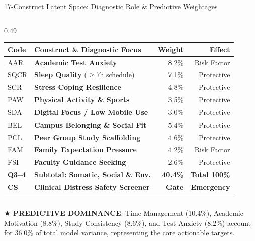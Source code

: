 \documentclass{beamer}
\begin{document}
\begin{frame}[t]{17-Construct Latent Space: Diagnostic Role \& Predictive Weightages}
\begin{columns}[T]
\begin{column}{0.49\textwidth}
\begin{tcolorbox}
        \renewcommand{\arraystretch}{0.65}
        \begin{tabularx}{\linewidth}{@{}l X r r@{}}
          \toprule
          \textbf{Code} & \textbf{Construct \& Diagnostic Focus} & \textbf{Weight} & \textbf{Effect} \\
          \midrule
          \rowcolor{BlueLight} AAR & \textbf{Academic Test Anxiety} & 8.2\% & Risk Factor \\
          \rowcolor{BlueLight} SQCR & \textbf{Sleep Quality} ($\ge 7$h schedule) & 7.1\% & Protective \\
          \rowcolor{BlueLight} SCR & \textbf{Stress Coping Resilience} & 4.8\% & Protective \\
          \rowcolor{BlueLight} PAW & \textbf{Physical Activity \& Sports} & 3.5\% & Protective \\
          \rowcolor{BlueLight} SDA & \textbf{Digital Focus / Low Mobile Use} & 3.0\% & Protective \\
          \midrule
          \rowcolor{CanvasBG} BEL & \textbf{Campus Belonging \& Social Fit} & 5.4\% & Protective \\
          \rowcolor{CanvasBG} PCL & \textbf{Peer Group Study Scaffolding} & 4.6\% & Protective \\
          \rowcolor{CanvasBG} FAM & \textbf{Family Expectation Pressure} & 4.2\% & Risk Factor \\
          \rowcolor{CanvasBG} FSI & \textbf{Faculty Guidance Seeking} & 2.6\% & Protective \\
          \midrule
          \textbf{Q3--4} & \textbf{Subtotal: Somatic, Social \& Env.} & \textbf{40.4\%} & \textbf{Total 100\%} \\
          \rowcolor{GoldBG} \textbf{CS} & \textbf{Clinical Distress Safety Screener} & \textbf{Gate} & \textbf{Emergency} \\
          \bottomrule
        \end{tabularx}
      \end{tcolorbox}
    \end{column}
  \end{columns}
  \vspace{0.8mm}

  \begin{takeawaybanner}
    \fontsize{4.8pt}{5.8pt}\selectfont
    \textbf{\color{GoldPill}$\bigstar$ PREDICTIVE DOMINANCE}: Time Management (10.4\%), Academic Motivation (8.8\%), Study Consistency (8.6\%), and Test Anxiety (8.2\%) account for 36.0\% of total model variance, representing the core actionable targets.
  \end{takeawaybanner}
\end{frame}
\end{document}

